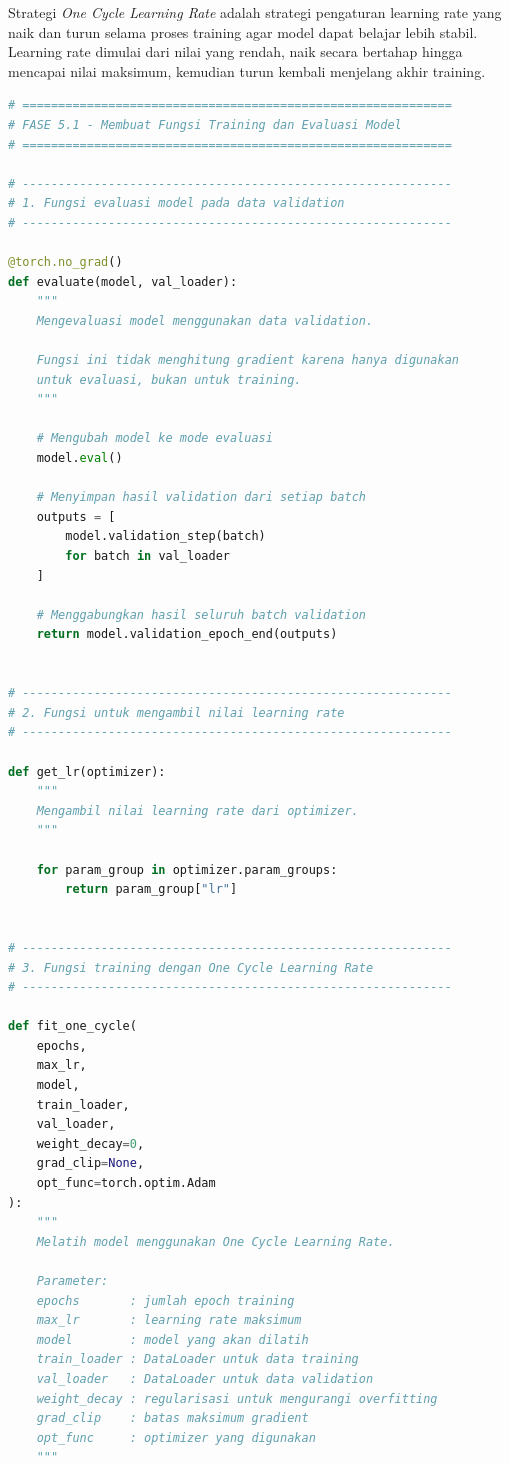 Strategi \textit{One Cycle Learning Rate} adalah strategi pengaturan learning rate yang naik dan turun selama proses training agar model dapat belajar lebih stabil. Learning rate dimulai dari nilai yang rendah, naik secara bertahap hingga mencapai nilai maksimum, kemudian turun kembali menjelang akhir training.

\begin{lstlisting}[language=Python, caption=Membuat fungsi training dan evaluasi model]
# ============================================================
# FASE 5.1 - Membuat Fungsi Training dan Evaluasi Model
# ============================================================

# ------------------------------------------------------------
# 1. Fungsi evaluasi model pada data validation
# ------------------------------------------------------------

@torch.no_grad()
def evaluate(model, val_loader):
    """
    Mengevaluasi model menggunakan data validation.

    Fungsi ini tidak menghitung gradient karena hanya digunakan
    untuk evaluasi, bukan untuk training.
    """

    # Mengubah model ke mode evaluasi
    model.eval()

    # Menyimpan hasil validation dari setiap batch
    outputs = [
        model.validation_step(batch)
        for batch in val_loader
    ]

    # Menggabungkan hasil seluruh batch validation
    return model.validation_epoch_end(outputs)


# ------------------------------------------------------------
# 2. Fungsi untuk mengambil nilai learning rate
# ------------------------------------------------------------

def get_lr(optimizer):
    """
    Mengambil nilai learning rate dari optimizer.
    """

    for param_group in optimizer.param_groups:
        return param_group["lr"]


# ------------------------------------------------------------
# 3. Fungsi training dengan One Cycle Learning Rate
# ------------------------------------------------------------

def fit_one_cycle(
    epochs,
    max_lr,
    model,
    train_loader,
    val_loader,
    weight_decay=0,
    grad_clip=None,
    opt_func=torch.optim.Adam
):
    """
    Melatih model menggunakan One Cycle Learning Rate.

    Parameter:
    epochs       : jumlah epoch training
    max_lr       : learning rate maksimum
    model        : model yang akan dilatih
    train_loader : DataLoader untuk data training
    val_loader   : DataLoader untuk data validation
    weight_decay : regularisasi untuk mengurangi overfitting
    grad_clip    : batas maksimum gradient
    opt_func     : optimizer yang digunakan
    """


\end{lstlisting}
